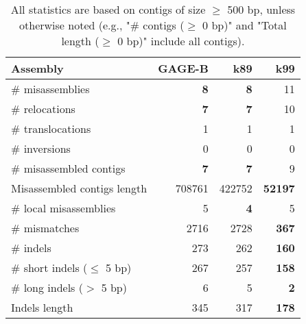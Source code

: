 \documentclass[12pt,a4paper]{article}
\begin{document}
\begin{table}[ht]
\begin{center}
\caption{All statistics are based on contigs of size $\geq$ 500 bp, unless otherwise noted (e.g., "\# contigs ($\geq$ 0 bp)" and "Total length ($\geq$ 0 bp)" include all contigs).}
\begin{tabular}{|l*{3}{|r}|}
\hline
Assembly & GAGE-B & k89 & k99 \\ \hline
\# misassemblies & {\bf 8} & {\bf 8} & 11 \\ \hline
\hspace{5mm}\# relocations & {\bf 7} & {\bf 7} & 10 \\ \hline
\hspace{5mm}\# translocations & 1 & 1 & 1 \\ \hline
\hspace{5mm}\# inversions & 0 & 0 & 0 \\ \hline
\# misassembled contigs & {\bf 7} & {\bf 7} & 9 \\ \hline
Misassembled contigs length & 708761 & 422752 & {\bf 52197} \\ \hline
\# local misassemblies & 5 & {\bf 4} & 5 \\ \hline
\# mismatches & 2716 & 2728 & {\bf 367} \\ \hline
\# indels & 273 & 262 & {\bf 160} \\ \hline
\hspace{5mm}\# short indels ($\leq$ 5 bp) & 267 & 257 & {\bf 158} \\ \hline
\hspace{5mm}\# long indels ($>$ 5 bp) & 6 & 5 & {\bf 2} \\ \hline
Indels length & 345 & 317 & {\bf 178} \\ \hline
\end{tabular}
\end{center}
\end{table}
\end{document}
